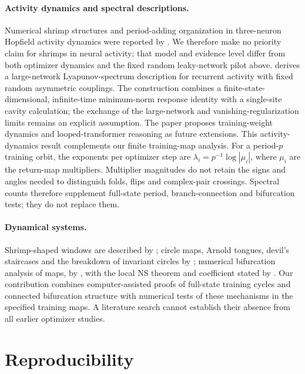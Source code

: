 \documentclass[11pt,letterpaper]{article}
\begin{document}
\paragraph{Activity dynamics and spectral descriptions.} Numerical shrimp structures and
period-adding organization in three-neuron Hopfield activity dynamics were
reported by \citet{dasilvarech2022}. We therefore make no priority claim for
shrimps in neural activity; that model and evidence level differ from both
optimizer dynamics and the fixed random leaky-network pilot above.
\citet{clark2026lyapunov} derives a
large-network Lyapunov-spectrum description for recurrent activity with fixed random asymmetric couplings.
The construction combines a finite-state-dimensional, infinite-time minimum-norm response identity with a single-site cavity
calculation; the exchange of the large-network and vanishing-regularization limits remains an explicit
assumption. The paper proposes training-weight dynamics and looped-transformer reasoning as future
extensions. This activity-dynamics result complements our finite training-map analysis. For a period-$p$
training orbit, the exponents per optimizer step are $\lambda_i=p^{-1}\log|\mu_i|$, where $\mu_i$ are the
return-map multipliers. Multiplier magnitudes do not retain the signs and angles needed to distinguish folds,
flips and complex-pair crossings. Spectral counts therefore supplement full-state period, branch-connection
and bifurcation tests; they do not replace them.

\paragraph{Dynamical systems.} Shrimp-shaped windows are described by \citet{gallas1993,gallas1994}; circle maps,
Arnold tongues, devil's staircases and the breakdown of invariant circles by
\citet{arnold1965,jensen1983,jensen1984,curry1978,aronson1982,ostlund1983}; numerical bifurcation analysis of maps,
by \citet{kuznetsov2019}, with the local NS theorem and coefficient stated by
\citet{kuznetsovsacker2008}. Our contribution combines computer-assisted proofs of full-state training cycles and connected bifurcation structure with numerical tests of these mechanisms in the specified training maps. A literature search cannot establish their absence from all earlier optimizer studies.

\section{Reproducibility}
\label{sec:repro}
\end{document}

